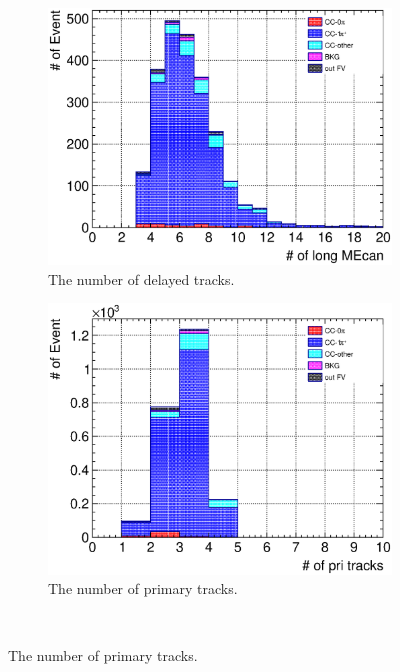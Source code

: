 \begin{figure}
  \\
  \begin{subfigure}{\dbfigwid\textwidth}
       \includegraphics[width=\textwidth]{figures/sel/TPCmu_nsdptrk_stack_al9.eps}
       \caption{The number of delayed tracks.}
       \label{subfig:tlpi-trknum-delayed-cut}
  \end{subfigure}
  \begin{subfigure}{\dbfigwid\textwidth}
       \includegraphics[width=\textwidth]{figures/sel/TPCmu_npri_stack_al9.eps}
       \caption{The number of primary tracks.}
       \label{subfig:tlpi-trknum-pri-cut}
  \end{subfigure}
  \\

\end{figure}
